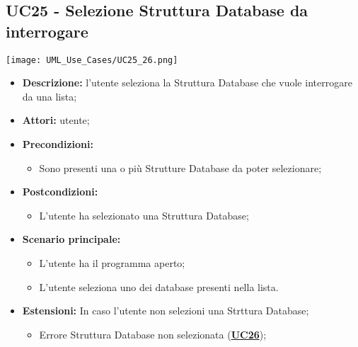 \subsection{UC25 - Selezione Struttura Database da interrogare}
\label{sec:UC25}
\texttt{[image: UML\_Use\_Cases/UC25\_26.png]}
\begin{itemize}
	\item \textbf{Descrizione:} l’utente seleziona la Struttura Database che vuole interrogare da una lista;
	\item \textbf{Attori:} utente;
	\item \textbf{Precondizioni:}
	\begin{itemize}
		\item Sono presenti una o più Strutture Database da poter selezionare;
	\end{itemize}
	\item \textbf{Postcondizioni:}
	\begin{itemize}
		\item L’utente ha selezionato una Struttura Database;
	\end{itemize}
	\item \textbf{Scenario principale:}
	\begin{itemize}
		\item L’utente ha il programma aperto;
		\item L’utente seleziona uno dei database presenti nella lista.
	\end{itemize}
	\item \textbf{Estensioni:} In caso l'utente non selezioni una Strttura Database;
	\begin{itemize}
		\item Errore Struttura Database non selezionata (\hyperref[sec:UC26]{\textbf{UC26}});
	\end{itemize}
\end{itemize}

